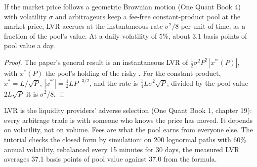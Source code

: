 \begin{proposition}\label{prop:m3:automated-market-makers:lvrcp}
If the market price follows a geometric Brownian motion (One Quant Book 4) with volatility $\sigma$ and arbitrageurs keep a fee-free
constant-product pool at the market price, LVR accrues at the instantaneous rate $\sigma^2/8$ per unit of time, as a fraction of the pool's
value. At a daily volatility of 5\%, about 3.1 basis points of pool value a day.
\end{proposition}

\begin{proof}
The paper's general result is an instantaneous LVR of $\tfrac12\sigma^2P^2\,|x^{*\prime}(P)|$, with $x^*(P)$ the pool's holding of the
risky . For the constant product, $x^* = L/\sqrt{P}$, $|x^{*\prime}| = \tfrac12 L P^{-3/2}$, and the rate is $\tfrac14 L\sigma^2\sqrt{P}$;
divided by the pool value $2L\sqrt{P}$ it is $\sigma^2/8$.
\end{proof}

LVR is the liquidity providers' adverse selection (One Quant Book 1, chapter 19): every arbitrage trade is with someone who knows the price
has moved. It depends on volatility, not on volume. Fees are what the pool earns from everyone else. The tutorial checks the closed form by
simulation: on 200 lognormal paths with 60\% annual volatility, rebalanced every 15 minutes for 30 days, the measured LVR averages 37.1 basis
points of pool value against 37.0 from the formula.

\begin{omfigure}

\label{fig:m3:automated-market-makers:lvr}
\end{omfigure}

